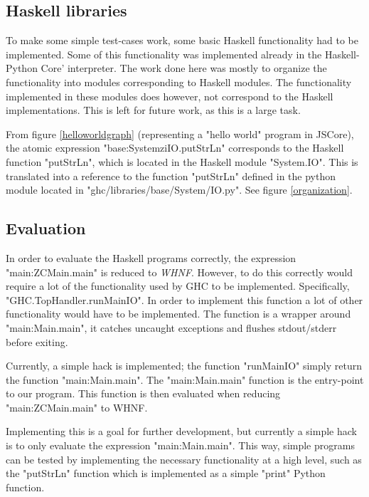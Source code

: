 \subsection{Haskell libraries}

To make some simple test-cases work, some basic Haskell functionality had to be 
implemented. Some of this functionality was implemented already in the 
Haskell-Python Core' interpreter.
The work done here was mostly to organize the functionality into modules corresponding
to Haskell modules. The functionality implemented in these modules does however, 
not correspond to the Haskell implementations. This is left for future work, as this 
is a large task.

From figure \ref{helloworldgraph} (representing a "hello world" program in JSCore), 
the atomic 
expression "base:SystemziIO.putStrLn" corresponds
to the Haskell function "putStrLn", which is located in the Haskell module "System.IO". This is translated
into a reference to the function "putStrLn" defined in the python module located in 
"ghc/libraries/base/System/IO.py". See figure \ref{organization}.

\subsection{Evaluation}
\begin{sloppypar}
In order to evaluate the Haskell programs correctly, the expression "main:ZCMain.main" 
is reduced to \emph{WHNF}. However, to do this correctly would require a lot of 
the functionality used by GHC
to be implemented. Specifically, "GHC.TopHandler.runMainIO". 
In order to implement this function
a lot of other functionality would have to be implemented. 
The function is a wrapper around 
"main:Main.main", it catches uncaught exceptions and flushes stdout/stderr 
before exiting. 
\end{sloppypar}

Currently, a simple hack is implemented; the function "runMainIO" simply return 
the function "main:Main.main".
The "main:Main.main" function is the entry-point to our program. This function 
is then evaluated when reducing "main:ZCMain.main" to WHNF.

Implementing this is a goal for further
development, but currently a simple hack is to only evaluate the expression 
"main:Main.main". This way,
simple programs can be tested by implementing the necessary functionality 
at a high level, such as the
"putStrLn" function which is implemented as a simple "print" Python function.

